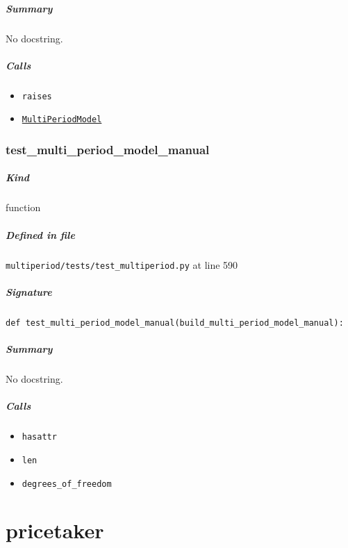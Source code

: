 \documentclass[11pt]{report}
\begin{document}
\paragraph{Summary} No docstring.
\paragraph{Calls}
\begin{itemize}[leftmargin=*]
  \item \texttt{raises}
  \item \hyperref[def:multiperiod-multiperiod.py:MultiPeriodModel:L24]{\texttt{MultiPeriodModel}}
\end{itemize}
\subsection{test\_multi\_period\_model\_manual}
\label{def:multiperiod-tests-test_multiperiod.py:test_multi_period_model_manual:L590}
\paragraph{Kind} function
\paragraph{Defined in file} \texttt{multiperiod/tests/test\_multiperiod.py} at line 590
\paragraph{Signature} \texttt{def test\_multi\_period\_model\_manual(build\_multi\_period\_model\_manual):}
\paragraph{Summary} No docstring.
\paragraph{Calls}
\begin{itemize}[leftmargin=*]
  \item \texttt{hasattr}
  \item \texttt{len}
  \item \texttt{degrees\_of\_freedom}
\end{itemize}

\chapter{pricetaker}
\end{document}
